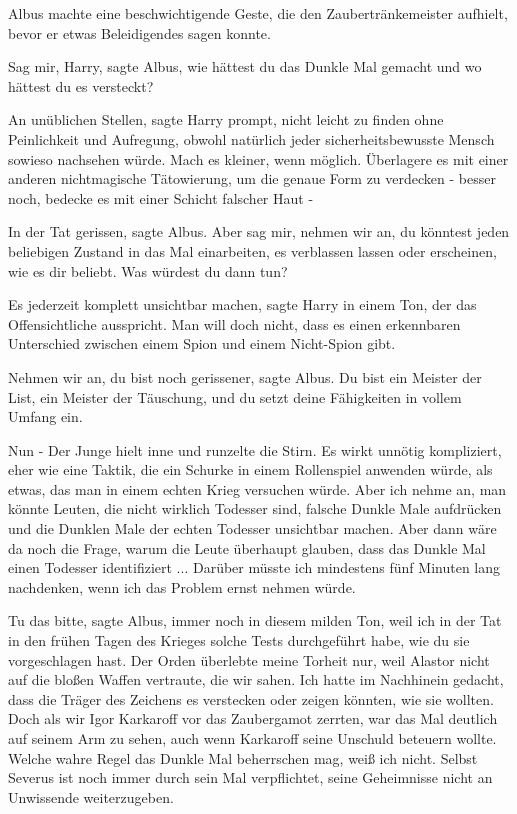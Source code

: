 Albus machte eine beschwichtigende Geste, die den Zaubertränkemeister aufhielt,
bevor er etwas Beleidigendes sagen konnte.

\glqq{}Sag mir, Harry\grqq{}, sagte Albus, \glqq{}wie hättest du das Dunkle Mal
gemacht und wo hättest du es versteckt?\grqq{}

\glqq{}An unüblichen Stellen\grqq{}, sagte Harry prompt, \glqq{}nicht leicht zu
finden ohne Peinlichkeit und Aufregung, obwohl natürlich jeder
sicherheitsbewusste Mensch sowieso nachsehen würde. Mach es kleiner, wenn
möglich. Überlagere es mit einer anderen nichtmagische Tätowierung, um die
genaue Form zu verdecken - besser noch, bedecke es mit einer Schicht falscher
Haut -\grqq{}

\glqq{}In der Tat gerissen\grqq{}, sagte Albus. \glqq{}Aber sag mir, nehmen wir
an, du könntest jeden beliebigen Zustand in das Mal einarbeiten, es verblassen
lassen oder erscheinen, wie es dir beliebt. Was würdest du dann tun?\grqq{}

\glqq{}Es jederzeit komplett unsichtbar machen\grqq{}, sagte Harry in einem Ton,
der das Offensichtliche ausspricht. \glqq{}Man will doch nicht, dass es einen
erkennbaren Unterschied zwischen einem Spion und einem Nicht-Spion gibt.\grqq{}

\glqq{}Nehmen wir an, du bist noch gerissener\grqq{}, sagte Albus. \glqq{}Du bist
ein Meister der List, ein Meister der Täuschung, und du setzt deine Fähigkeiten
in vollem Umfang ein.\grqq{}

\glqq{}Nun -\grqq{} Der Junge hielt inne und runzelte die Stirn. \glqq{}Es wirkt
unnötig kompliziert, eher wie eine Taktik, die ein Schurke in einem Rollenspiel
anwenden würde, als etwas, das man in einem echten Krieg versuchen würde. Aber
ich nehme an, man könnte Leuten, die nicht wirklich Todesser sind, falsche
Dunkle Male aufdrücken und die Dunklen Male der echten Todesser unsichtbar
machen. Aber dann wäre da noch die Frage, warum die Leute überhaupt glauben,
dass das Dunkle Mal einen Todesser identifiziert ... Darüber müsste ich
mindestens fünf Minuten lang nachdenken, wenn ich das Problem ernst nehmen
würde.\grqq{}

\glqq{}Tu das bitte\grqq{}, sagte Albus, immer noch in diesem milden Ton, \glqq{}
weil ich in der Tat in den frühen Tagen des Krieges solche Tests durchgeführt
habe, wie du sie vorgeschlagen hast. Der Orden überlebte meine Torheit nur, weil
Alastor nicht auf die bloßen Waffen vertraute, die wir sahen. Ich hatte im
Nachhinein gedacht, dass die Träger des Zeichens es verstecken oder zeigen
könnten, wie sie wollten. Doch als wir Igor Karkaroff vor das Zaubergamot
zerrten, war das Mal deutlich auf seinem Arm zu sehen, auch wenn Karkaroff seine
Unschuld beteuern wollte. Welche wahre Regel das Dunkle Mal beherrschen mag,
weiß ich nicht. Selbst Severus ist noch immer durch sein Mal verpflichtet, seine
Geheimnisse nicht an Unwissende weiterzugeben.\grqq{}

